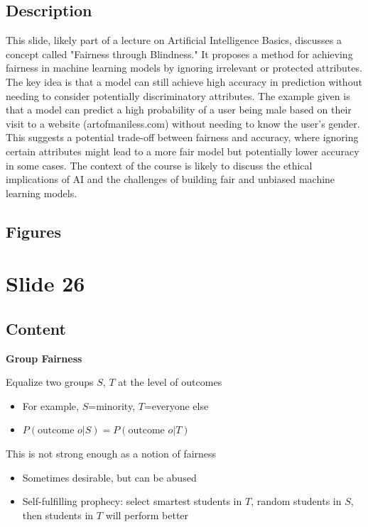 \documentclass{article}%
\begin{document}
\subsection{Description}%
This slide, likely part of a lecture on Artificial Intelligence Basics, discusses a concept called "Fairness through Blindness."  It proposes a method for achieving fairness in machine learning models by ignoring irrelevant or protected attributes.  The key idea is that a model can still achieve high accuracy in prediction without needing to consider potentially discriminatory attributes.  The example given is that a model can predict a high probability of a user being male based on their visit to a website (artofmaniless.com) without needing to know the user's gender.  This suggests a potential trade-off between fairness and accuracy, where ignoring certain attributes might lead to a more fair model but potentially lower accuracy in some cases. The context of the course is likely to discuss the ethical implications of AI and the challenges of building fair and unbiased machine learning models.%
\subsection{Figures}%
\begin{figure}[H]%
\centering%
\end{figure}

%
\newpage%
\section{Slide 26}%
\label{sec:Slide26}%
\subsection{Content}%

\textbf{Group Fairness}

Equalize two groups $S$, $T$ at the level of outcomes

\begin{itemize}
    \item For example, $S$=minority, $T$=everyone else
    \item $P(\text{outcome } o | S) = P(\text{outcome } o | T)$
\end{itemize}

This is not strong enough as a notion of fairness

\begin{itemize}
    \item Sometimes desirable, but can be abused
    \item Self-fulfilling prophecy: select smartest students in $T$, random students in $S$, then students in $T$ will perform better
\end{itemize}
%
\end{document}

